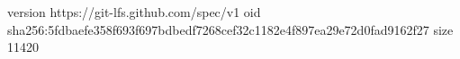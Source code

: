 version https://git-lfs.github.com/spec/v1
oid sha256:5fdbaefe358f693f697bdbedf7268cef32c1182e4f897ea29e72d0fad9162f27
size 11420
